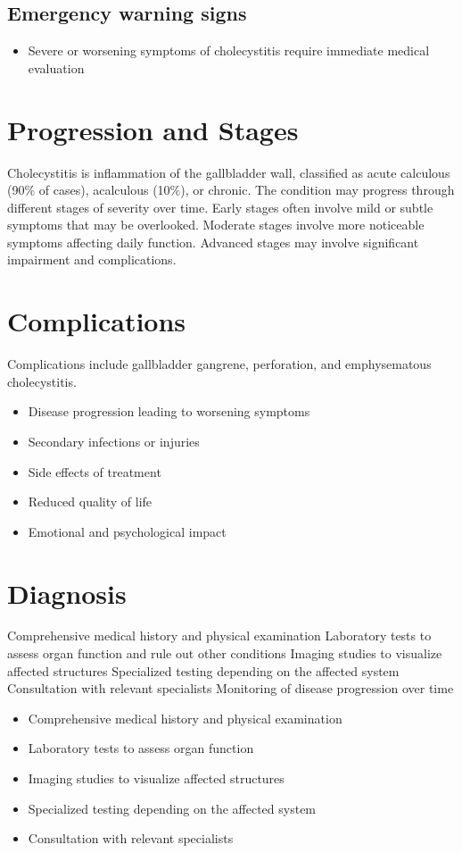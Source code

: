 \subsection{Emergency warning signs}
\begin{itemize}[noitemsep]
  \item Severe or worsening symptoms of cholecystitis require immediate medical evaluation
\end{itemize}
\section{Progression and Stages}
Cholecystitis is inflammation of the gallbladder wall, classified as acute calculous (90\% of cases), acalculous (10\%), or chronic. The condition may progress through different stages of severity over time. Early stages often involve mild or subtle symptoms that may be overlooked. Moderate stages involve more noticeable symptoms affecting daily function. Advanced stages may involve significant impairment and complications.
\section{Complications}
Complications include gallbladder gangrene, perforation, and emphysematous cholecystitis.

\begin{itemize}[noitemsep]
  \item Disease progression leading to worsening symptoms
  \item Secondary infections or injuries
  \item Side effects of treatment
  \item Reduced quality of life
  \item Emotional and psychological impact
\end{itemize}
\section{Diagnosis}
Comprehensive medical history and physical examination Laboratory tests to assess organ function and rule out other conditions Imaging studies to visualize affected structures Specialized testing depending on the affected system Consultation with relevant specialists Monitoring of disease progression over time

\begin{itemize}[noitemsep]
  \item Comprehensive medical history and physical examination
  \item Laboratory tests to assess organ function
  \item Imaging studies to visualize affected structures
  \item Specialized testing depending on the affected system
  \item Consultation with relevant specialists
\end{itemize}
